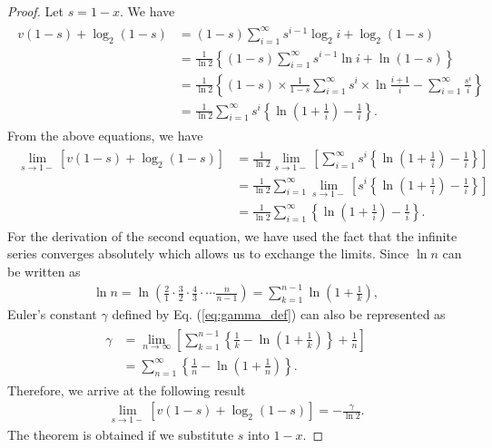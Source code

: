 \begin{proof}
Let $s=1-x$. We have
%
\begin{align}\begin{split}
	v(1-s) + \log_2 (1-s) 
	&= (1-s)\sum_{i=1}^{\infty} s^{i-1}\log_2 i + \log_2 (1-s) \\
	&= \frac{1}{\ln2} \left\{ (1-s) \sum_{i=1}^{\infty}s^{i-1}\ln i + \ln(1-s) \right\} \\
	&= \frac{1}{\ln2} \left\{ (1-s)\times \frac{1}{1-s} \sum_{i=1}^{\infty}s^{i} \times \ln \frac{i+1}{i} - \sum_{i=1}^{\infty} \frac{s^i}{i} \right\} \\
	&= \frac{1}{\ln2} \sum_{i=1}^{\infty}s^{i} \left\{ \ln \left(1+\frac{1}{i}\right) - \frac{1}{i} \right\}.
\end{split}\end{align}
From the above equations, we have
\begin{align}\begin{split}
	\lim_{s\to 1-} \left[ v(1-s) + \log_2 (1-s) \right] 
	&=\frac{1}{\ln2} \lim_{s\to 1-} \left[ \sum_{i=1}^{\infty} s^{i} \left\{ \ln \left(1+\frac{1}{i}\right) - \frac{1}{i} \right\} \right]\\
	&=\frac{1}{\ln2} \sum_{i=1}^{\infty} \lim_{s\to 1-} \left[ s^{i} \left\{ \ln \left(1+\frac{1}{i}\right) - \frac{1}{i} \right\} \right] \\
	&=\frac{1}{\ln2} \sum_{i=1}^{\infty}\left\{ \ln \left(1+\frac{1}{i}\right) - \frac{1}{i} \right\}.
\end{split}\end{align}
For the derivation of the second equation, we have used the fact that the infinite series converges absolutely which allows us to exchange the limits. 
%
Since $\ln n$ can be written as 
\begin{align}
	\ln n = \ln \left( \frac{2}{1}\cdot\frac{3}{2}\cdot\frac{4}{3}\cdot\cdots\frac{n}{n-1}\right) = \sum_{k=1}^{n-1}\ln\left(1+\frac{1}{k}\right),
\end{align}
Euler's constant $\gamma$ defined by Eq. (\ref{eq:gamma_def}) can also be represented as
\begin{align}\begin{split}
	\gamma &= \lim_{n\to\infty} \left[ \sum_{k=1}^{n-1}\left\{ \frac{1}{k} - \ln \left(1+\frac{1}{k}\right)\right\} + \frac{1}{n} \right] \\
	&=\sum_{n=1}^{\infty}\left\{ \frac{1}{n} - \ln \left(1+\frac{1}{n}\right) \right\}.
\end{split}\end{align}
Therefore, we arrive at the following result
\begin{align}
	\lim_{s\to 1-} \left[ v(1-s) + \log_2 (1-s) \right]  =- \frac{\gamma}{\ln 2}.
\end{align}
The theorem is obtained if we substitute $s$ into $1-x$.
\end{proof}